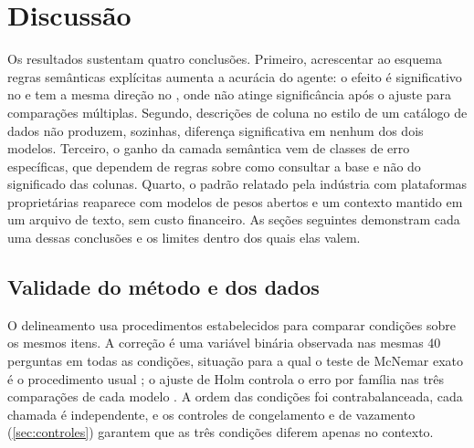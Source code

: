 \chapter{Discussão}
\label{cap:discussao}

Os resultados sustentam quatro conclusões. Primeiro, acrescentar ao
esquema regras semânticas explícitas aumenta a acurácia do agente: o
efeito é significativo no  e tem a mesma direção no
, onde não atinge significância após o ajuste para
comparações múltiplas. Segundo, descrições de coluna no estilo de um
catálogo de dados não produzem, sozinhas, diferença significativa em
nenhum dos dois modelos. Terceiro, o ganho da camada semântica vem de
classes de erro específicas, que dependem de regras sobre como consultar a
base e não do significado das colunas. Quarto, o padrão relatado pela
indústria com plataformas proprietárias reaparece com modelos de pesos
abertos e um contexto mantido em um arquivo de texto, sem custo
financeiro. As seções seguintes demonstram cada uma dessas conclusões e
os limites dentro dos quais elas valem.

\section{Validade do método e dos dados}
\label{sec:validade}

O delineamento usa procedimentos estabelecidos para comparar condições
sobre os mesmos itens. A correção é uma variável binária observada nas
mesmas 40 perguntas em todas as condições, situação para a qual o teste de
McNemar exato é o procedimento usual
\cite{mcnemar1947note,fagerland2013mcnemar}; o ajuste de Holm controla o
erro por família nas três comparações de cada modelo
\cite{holm1979simple}. A ordem das condições foi contrabalanceada, cada
chamada é independente, e os controles de congelamento e de vazamento
(\autoref{sec:controles}) garantem que as três condições diferem apenas
no contexto.

